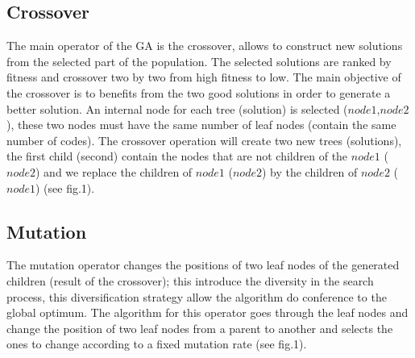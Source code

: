 \documentclass[preprint,12pt]{elsarticle}
\begin{document}
\subsection{Crossover}
The main operator of the GA is the crossover, allows to construct new solutions from the selected part of the population. The selected solutions are ranked by fitness and crossover two by two from high fitness to low. The main objective of the crossover is to benefits from the two good solutions in order to generate a better solution. An internal node for each tree (solution) is selected (\textit{$node1$},\textit{$node2$}), these two nodes must have the same number of leaf nodes (contain the same number of codes). The crossover operation will create two new trees (solutions), the first child (second) contain the nodes that are not children of the \textit{$node1$} (\textit{$node2$}) and we replace the children of \textit{$node1$} (\textit{$node2$}) by the children of \textit{$node2$} (\textit{$node1$}) (see fig.1). 
\subsection{Mutation}
The mutation operator changes the positions of two leaf nodes of the generated children (result of the crossover); this introduce the diversity in the search process, this diversification strategy allow the algorithm do conference to the global optimum. The algorithm for this operator goes through the leaf nodes and change the position of two leaf nodes from a parent to another and selects the ones to change according to a fixed mutation rate (see fig.1).
\end{document}
